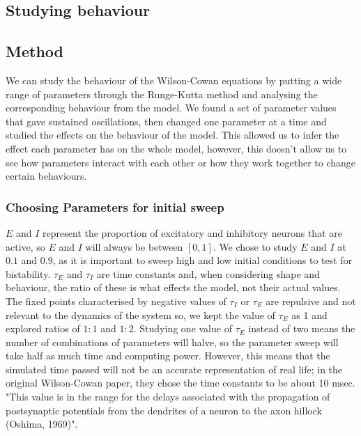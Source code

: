 \documentclass[10pt]{article}
\begin{document}
\begin{flushleft}

\section{Studying behaviour}

\subsection{Method}

We can study the behaviour of the Wilson-Cowan equations by putting a wide range of parameters through the Runge-Kutta method and analysing the corresponding behaviour from the model. We found a set of parameter values that gave sustained oscillations, then changed one parameter at a time and studied the effects on the behaviour of the model. This allowed us to infer the effect each parameter has on the whole model, however, this doesn't allow us to see how parameters interact with each other or how they work together to change certain behaviours.

\subsubsection{Choosing Parameters for initial sweep}

$E$ and $I$ represent the proportion of excitatory and inhibitory neurons that are active, so $E$ and $I$ will always be between $[0, 1]$. We chose to study $E$ and $I$ at $0.1$ and $0.9$, as it is important to sweep high and low initial conditions to test for bistability. $\tau_E$ and $\tau_I$ are time constants and, when considering shape and behaviour, the ratio of these is what effects the model, not their actual values. The fixed points characterised by negative values of $\tau_I$ or $\tau_E$ are repulsive and not relevant to the dynamics of the system\cite{journal} so, we kept the value of $\tau_E$ as 1 and explored ratios of $1:1$ and $1:2$. Studying one value of $\tau_E$ instead of two means the number of combinations of parameters will halve, so the parameter sweep will take half as much time and computing power. However, this means that the simulated time passed will not be an accurate representation of real life; in the original Wilson-Cowan paper\cite{hi}, they chose the time constants to be about 10 msec. "This value is in the range for the delays associated with the propagation of postsynaptic potentials from the dendrites of a neuron to the axon hillock (Oshima, 1969)"\cite{Oshima}.
\newline


\end{flushleft}
\end{document}
